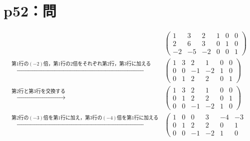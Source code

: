 \documentclass[a4paper,10pt,fleqn]{ltjsarticle}
\begin{document}
\newpage

\section*{p52：問}

\begin{tleftbar}
    \begin{align*}
                                                                            &
        \left(
        \begin{array}{ccc|ccc}
                1  & 3  & 2  & 1 & 0 & 0 \\
                2  & 6  & 3  & 0 & 1 & 0 \\
                -2 & -5 & -2 & 0 & 0 & 1
            \end{array}
        \right)                                                               \\
        \xrightarrow{\text{第$1$行の$(-2)$倍，第$1$行の$2$倍をそれぞれ第$2$行，第$3$行に加える}}   &
        \left( \begin{array}{ccc|ccc}
                       1 & 3 & 2  & 1  & 0 & 0 \\
                       0 & 0 & -1 & -2 & 1 & 0 \\
                       0 & 1 & 2  & 2  & 0 & 1
                   \end{array}
        \right)                                                               \\
        \xrightarrow{\text{第$2$行と第$3$行を交換する}}                               &
        \left( \begin{array}{ccc|ccc}
                       1 & 3 & 2  & 1  & 0 & 0 \\
                       0 & 1 & 2  & 2  & 0 & 1 \\
                       0 & 0 & -1 & -2 & 1 & 0
                   \end{array}
        \right)                                                               \\
        \xrightarrow{\text{第$2$行の$(-3)$倍を第$1$行に加え，第$3$行の$(-4)$倍を第$1$行に加える}} &
        \left( \begin{array}{ccc|ccc}
                       1 & 0 & 0  & 3  & -4 & -3 \\
                       0 & 1 & 2  & 2  & 0  & 1  \\
                       0 & 0 & -1 & -2 & 1  & 0

\end{array}
\end{align*}
\end{tleftbar}
\end{document}
